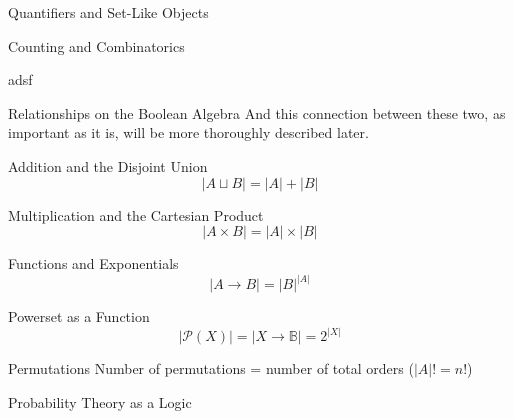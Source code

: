 \begin{part}{Quantifiers and Set-Like Objects}
\begin{chapter}{Counting and Combinatorics}
\begin{section}{adsf}
\begin{subsection}{Relationships on the Boolean Algebra}
                And this connection between these two, as important as it is, will be more thoroughly described later.
            \end{subsection}
            \begin{subsection}{Addition and the Disjoint Union}
            $$
                |A \sqcup B| = |A| + |B|
            $$
            \end{subsection}
            \begin{subsection}{Multiplication and the Cartesian Product}
            $$
                |A \times B| = |A| \times |B|
            $$
            \end{subsection}
            \begin{subsection}{Functions and Exponentials}
            $$
                |A \to B| = |B|^{|A|}
            $$
            \end{subsection}
            \begin{subsection}{Powerset as a Function}
            $$
                |\mathcal{P}(X)| = | X \to \mathbb{B} | = 2^{|X|}
            $$
            \end{subsection}
            \begin{subsection}{Permutations}
                Number of permutations = number of total orders ($|A|! = n!$)
            \end{subsection}
        \end{section}
    \end{chapter}
    \begin{chapter}{Probability Theory as a Logic}
    \end{chapter}
\end{part}